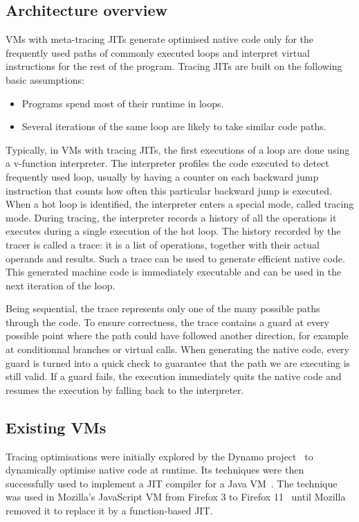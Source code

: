 \documentclass[a4paper,12pt,twoside]{../includes/ThesisStyle}
\begin{document}
\subsection{Architecture overview}

VMs with meta-tracing JITs generate optimised native code only for the frequently used paths of commonly executed loops and interpret virtual instructions for the rest of the program. Tracing JITs are built on the following basic assumptions:
\begin{itemize}
	\item Programs spend most of their runtime in loops.
	\item Several iterations of the same loop are likely to take similar code paths.
\end{itemize}

Typically, in VMs with tracing JITs, the first executions of a loop are done using a v-function interpreter. The interpreter profiles the code executed to detect frequently used loop, usually by having a counter on each backward jump instruction that counts how often this particular backward jump is executed. When a hot loop is identified, the interpreter enters a special mode, called tracing mode. During tracing, the interpreter records a history of all the operations it executes during a single execution of the hot loop. The history recorded by the tracer is called a trace: it is a list of operations, together with their actual operands and results. Such a trace can be used to generate efficient native code. This generated machine code is immediately executable and can be used in the next iteration of the loop.

Being sequential, the trace represents only one of the many possible paths through the code. To ensure correctness, the trace contains a guard at every possible point where the path could have followed another direction, for example at conditionnal branches or virtual calls. When generating the native code, every guard is turned into a quick check to guarantee that the path we are executing is still valid. If a guard fails, the execution immediately quits the native code and resumes the execution by falling back to the interpreter.

\subsection{Existing VMs}

Tracing optimisations were initially explored by the Dynamo project~\cite{Bala00a} to dynamically optimise native code at runtime. Its techniques were then successfully used to implement a JIT compiler for a Java VM~\cite{Gal06a}. The technique was used in Mozilla's JavaScript VM from Firefox 3 to Firefox 11~\cite{Gal09a} until Mozilla removed it to replace it by a function-based JIT. 
\end{document}
